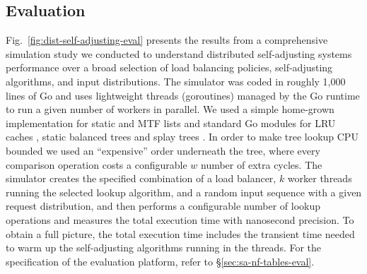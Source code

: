 
\subsection{Evaluation}
\label{sec:sims}

Fig.~\ref{fig:dist-self-adjusting-eval} presents the results from a comprehensive simulation study we conducted to understand distributed self-adjusting systems performance over a broad selection of load balancing policies, self-adjusting algorithms, and input distributions. The simulator was coded in roughly 1,000 lines of Go and uses lightweight threads (goroutines) managed by the Go runtime to run a given number of workers in parallel. We used a simple home-grown implementation for static and MTF lists and standard Go modules for LRU caches \cite{golang-lru}, static balanced trees \cite{golang-btree} and splay trees \cite{golang-splay}. In order to make tree lookup CPU bounded we used an ``expensive'' order underneath the tree, where every comparison operation costs a configurable $w$ number of extra cycles. The simulator creates the specified combination of a load balancer, $k$ worker threads running the selected lookup algorithm, and a random input sequence with a given request distribution, and then performs a configurable number of lookup operations and measures the total execution time with nanosecond precision. To obtain a full picture, the total execution time includes the transient time needed to warm up the self-adjusting algorithms running in the threads. For the specification of the evaluation platform, refer to \S\ref{sec:sa-nf-tables-eval}.

